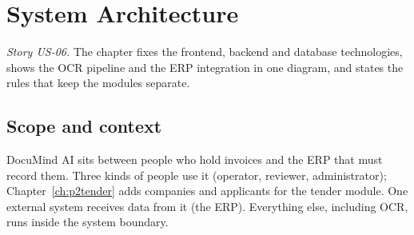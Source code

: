 \documentclass[11pt,a4paper]{report}
\newcommand{\projname}{DocuMind AI}
\begin{document}
\chapter{System Architecture}\label{ch:p2arch}
\emph{Story US-06.} The chapter fixes the frontend, backend and database technologies, shows the OCR pipeline and the ERP integration in one diagram, and states the rules that keep the modules separate.

\section{Scope and context}
\projname{} sits between people who hold invoices and the ERP that must record them. Three kinds of people use it (operator, reviewer, administrator); Chapter~\ref{ch:p2tender} adds companies and applicants for the tender module. One external system receives data from it (the ERP). Everything else, including OCR, runs inside the system boundary.
\end{document}

